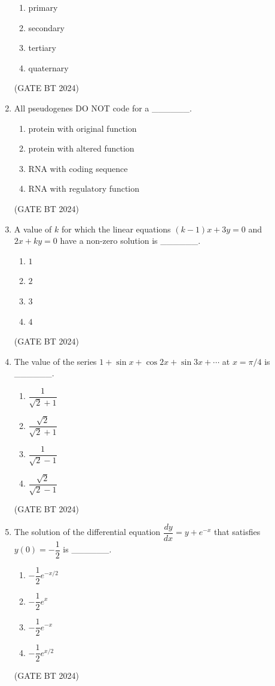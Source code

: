 \documentclass[journal,12pt,onecolumn]{IEEEtran}
\theoremstyle{remark}
\begin{document}
\begin{enumerate}
\begin{enumerate}
    \item primary
    \item secondary
    \item tertiary
    \item quaternary
\end{enumerate}
\hfill(GATE BT 2024)

\item 
All pseudogenes DO NOT code for a \_\_\_\_\_\_.

\begin{enumerate}
    \item protein with original function
    \item protein with altered function
    \item RNA with coding sequence
    \item RNA with regulatory function
\end{enumerate}
\hfill(GATE BT 2024)

\item 
A value of $k$ for which the linear equations $(k-1)x+3y=0$ and $2x+ky=0$ have a non-zero solution is \_\_\_\_\_\_.

\begin{enumerate}
    \item $1$
    \item $2$
    \item $3$
    \item $4$
\end{enumerate}
\hfill(GATE BT 2024)

\item 
The value of the series $1+\sin x+\cos 2x+\sin 3x+\cdots$ at $x=\pi/4$ is \_\_\_\_\_\_.

\begin{enumerate}
    \item $\dfrac{1}{\sqrt{2}+1}$
    \item $\dfrac{\sqrt{2}}{\sqrt{2}+1}$
    \item $\dfrac{1}{\sqrt{2}-1}$
    \item $\dfrac{\sqrt{2}}{\sqrt{2}-1}$
\end{enumerate}
\hfill(GATE BT 2024)

\item 
The solution of the differential equation $\dfrac{dy}{dx}=y+e^{-x}$ that satisfies $y(0)=-\dfrac{1}{2}$ is \_\_\_\_\_\_.

\begin{enumerate}
    \item $-\dfrac{1}{2}e^{-x/2}$
    \item $-\dfrac{1}{2}e^{x}$
    \item $-\dfrac{1}{2}e^{-x}$
    \item $-\dfrac{1}{2}e^{x/2}$
\end{enumerate}
\hfill(GATE BT 2024)


\end{enumerate}
\end{document}
